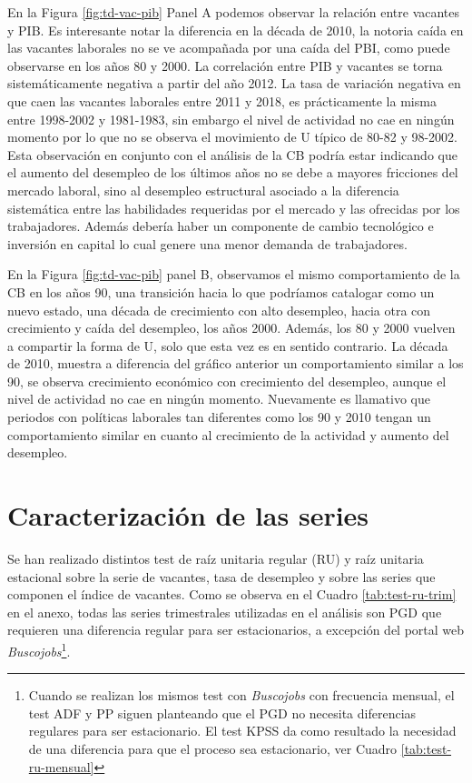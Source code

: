 \documentclass[12pt,oneside]{reedthesis}
\begin{document}
En la Figura \ref{fig:td-vac-pib} Panel A podemos observar la relación entre vacantes y PIB. Es interesante notar la diferencia en la década de 2010, la notoria caída en las vacantes laborales no se ve acompañada por una caída del PBI, como puede observarse en los años 80 y 2000. La correlación entre PIB y vacantes se torna sistemáticamente negativa a partir del año 2012. La tasa de variación negativa en que caen las vacantes laborales entre 2011 y 2018, es prácticamente la misma entre 1998-2002 y 1981-1983, sin embargo el nivel de actividad no cae en ningún momento por lo que no se observa el movimiento de U típico de 80-82 y 98-2002. Esta observación en conjunto con el análisis de la CB podría estar indicando que el aumento del desempleo de los últimos años no se debe a mayores fricciones del mercado laboral, sino al desempleo estructural asociado a la diferencia sistemática entre las habilidades requeridas por el mercado y las ofrecidas por los trabajadores. Además debería haber un componente de cambio tecnológico e inversión en capital lo cual genere una menor demanda de trabajadores.

En la Figura \ref{fig:td-vac-pib} panel B, observamos el mismo comportamiento de la CB en los años 90, una transición hacia lo que podríamos catalogar como un nuevo estado, una década de crecimiento con alto desempleo, hacia otra con crecimiento y caída del desempleo, los años 2000. Además, los 80 y 2000 vuelven a compartir la forma de U, solo que esta vez es en sentido contrario. La década de 2010, muestra a diferencia del gráfico anterior un comportamiento similar a los 90, se observa crecimiento económico con crecimiento del desempleo, aunque el nivel de actividad no cae en ningún momento. Nuevamente es llamativo que periodos con políticas laborales tan diferentes como los 90 y 2010 tengan un comportamiento similar en cuanto al crecimiento de la actividad y aumento del desempleo.

\hypertarget{caracterizaciuxf3n-de-las-series}{%
\section{Caracterización de las series}\label{caracterizaciuxf3n-de-las-series}}

Se han realizado distintos test de raíz unitaria regular (RU) y raíz unitaria estacional sobre la serie de vacantes, tasa de desempleo y sobre las series que componen el índice de vacantes. Como se observa en el Cuadro \ref{tab:test-ru-trim} en el anexo, todas las series trimestrales utilizadas en el análisis son PGD que requieren una diferencia regular para ser estacionarios, a excepción del portal web \emph{Buscojobs}\footnote{Cuando se realizan los mismos test con \emph{Buscojobs} con frecuencia mensual, el test ADF y PP siguen planteando que el PGD no necesita diferencias regulares para ser estacionario. El test KPSS da como resultado la necesidad de una diferencia para que el proceso sea estacionario, ver Cuadro \ref{tab:test-ru-mensual}}.
\end{document}
